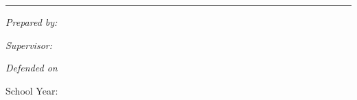\begin{titlepage}
\noindent\rule{\textwidth}{0.8pt}

\vspace{2.6em}
{\itshape Prepared by:\par}
\vspace{0.4em}
{\bfseries\itshape\large \projAuthorA\par}
\vspace{0.3em}
{\bfseries\itshape\large \projAuthorB\par}

\vspace{1.8em}
{\itshape Supervisor:\par}
\vspace{0.4em}
{\bfseries\itshape\large \projSupervisor\par}

\vspace{1.8em}
{\itshape\small Defended on \projDefDate\par}

\vspace{1.4em}
{\large School Year: \projYear\par}

\vfill
\end{titlepage}
